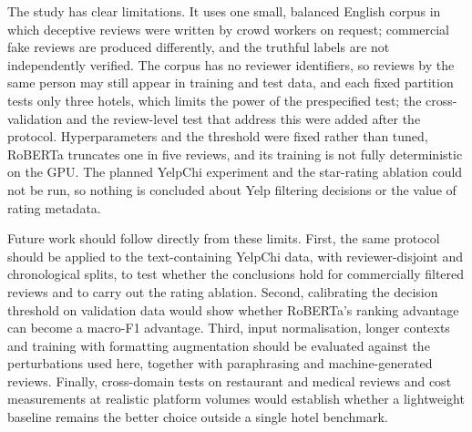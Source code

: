 The study has clear limitations. It uses one small, balanced English corpus in which deceptive reviews were written by crowd workers on request; commercial fake reviews are produced differently, and the truthful labels are not independently verified. The corpus has no reviewer identifiers, so reviews by the same person may still appear in training and test data, and each fixed partition tests only three hotels, which limits the power of the prespecified test; the cross-validation and the review-level test that address this were added after the protocol. Hyperparameters and the threshold were fixed rather than tuned, RoBERTa truncates one in five reviews, and its training is not fully deterministic on the GPU. The planned YelpChi experiment and the star-rating ablation could not be run, so nothing is concluded about Yelp filtering decisions or the value of rating metadata.

Future work should follow directly from these limits. First, the same protocol should be applied to the text-containing YelpChi data, with reviewer-disjoint and chronological splits, to test whether the conclusions hold for commercially filtered reviews and to carry out the rating ablation. Second, calibrating the decision threshold on validation data would show whether RoBERTa's ranking advantage can become a macro-F1 advantage. Third, input normalisation, longer contexts and training with formatting augmentation should be evaluated against the perturbations used here, together with paraphrasing and machine-generated reviews. Finally, cross-domain tests on restaurant and medical reviews and cost measurements at realistic platform volumes would establish whether a lightweight baseline remains the better choice outside a single hotel benchmark.
